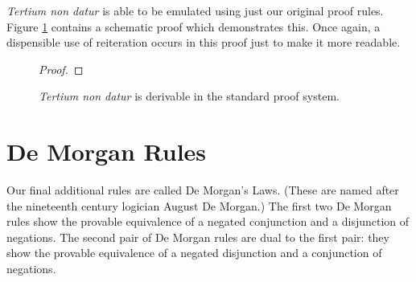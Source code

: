\emph{Tertium non datur} is able to be emulated using just our original proof rules. Figure \ref{fig.tndder} contains a schematic proof which demonstrates this. Once again, a dispensible use of reiteration occurs in this proof just to make it more readable.
\begin{figure}
\begin{proof}
		\open
		\close
		\open
		\close
		\have[\ ]{}{\vdots}
		\open
			\open
				\close
			\close
	\end{proof}
	\caption{\emph{Tertium non datur} is derivable in the standard proof system.\label{fig.tndder}}
\end{figure}






\section{De Morgan Rules}
Our final additional rules are called De Morgan's Laws. (These are named after the nineteenth century logician August De Morgan.) The first two De Morgan rules show the provable equivalence of a negated conjunction and a disjunction of negations.
The second pair of De Morgan rules are dual to the first pair: they show the provable equivalence of a negated disjunction and a conjunction of negations.

